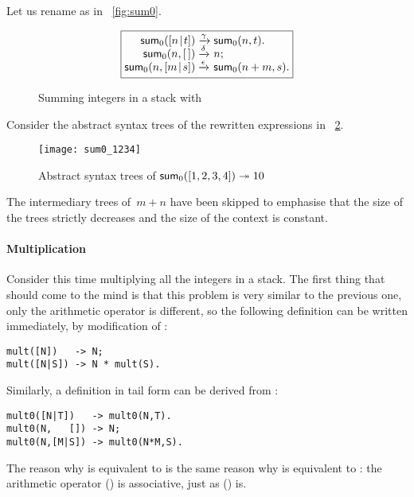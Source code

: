 Let us rename  as  in
\fig~\vref{fig:sum0}.
\begin{figure}
\begin{equation*}
\boxed{%
\begin{array}{@{}r@{\;}l@{\;}l@{}}
\fun{sum}_0(\cons{n}{t}) & \xrightarrow{\smash{\gamma}} 
                         & \fun{sum}_0(n,t).\\
      \fun{sum}_0(n,\el) & \xrightarrow{\smash{\delta}} & n;\\
\fun{sum}_0(n,\cons{m}{s}) & \xrightarrow{\smash{\epsilon}}
                           & \fun{sum}_0(n+m,s).
\end{array}}
\end{equation*}
\caption{Summing integers in a stack with 
\label{fig:sum0}}
\end{figure} 
Consider the abstract syntax trees of the rewritten
expressions in \fig~\ref{fig:sum0_1234}.
\begin{figure}
\centering
\texttt{[image: sum0\_1234]}
\caption{Abstract syntax trees of \(\textsf{sum}_0([1,2,3,4])
  \twoheadrightarrow 10\)\label{fig:sum0_1234}}
\end{figure}
The intermediary trees of~\(m+n\) have been skipped to emphasise that
the size of the trees strictly decreases and the size of the context
is constant.

\paragraph{Multiplication}

Consider this time multiplying all the integers in a stack. The first
thing that should come to the mind is that this problem is very
similar to the previous one, only the arithmetic operator is
different, so the following definition can be written immediately, by
modification of :
\begin{verbatim}
mult([N])   -> N;
mult([N|S]) -> N * mult(S).
\end{verbatim}
Similarly, a definition in tail form can be derived from
:
\begin{verbatim}
mult0([N|T])   -> mult0(N,T).
mult0(N,   []) -> N;
mult0(N,[M|S]) -> mult0(N*M,S).
\end{verbatim}
The reason why  is equivalent to  is
the same reason why  is equivalent to :
the arithmetic operator (\erlcode{*}) is associative, just as
(\erlcode{+}) is.


